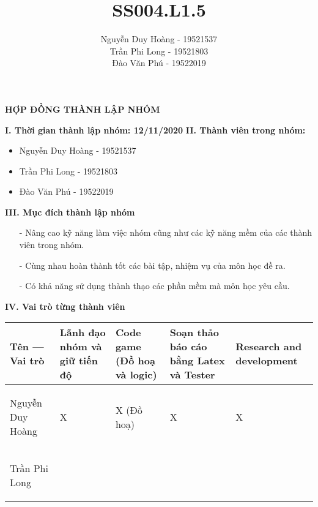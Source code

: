 \documentclass{article}
\title{\textbf{SS004.L1.5}}
\author{Nguyễn Duy Hoàng - 19521537\\Trần Phi Long - 19521803\\Đào Văn Phú - 19522019}
\begin{document}
\begin{center}
    \textbf{\Large{HỢP ĐỒNG THÀNH LẬP NHÓM}}
\end{center}

\begin{flushleft}
\textbf{\large I. Thời gian thành lập nhóm: 12/11/2020}
\newline
\textbf{\large II. Thành viên trong nhóm:}
\begin{center}
    \begin{itemize}
        \item Nguyễn Duy Hoàng - 19521537
        \item Trần Phi Long - 19521803
        \item Đào Văn Phú - 19522019
    \end{itemize}
\end{center}
\textbf{\large III. Mục đích thành lập nhóm}

\begin{itemize}
    \item[-]Nâng cao kỹ năng làm việc nhóm cũng như các kỹ năng mềm của các thành viên trong nhóm.
    \item[-]Cùng nhau hoàn thành tốt các bài tập, nhiệm vụ của môn học đề ra.
    \item[-]Có khả năng sử dụng thành thạo các phần mềm mà môn học yêu cầu.
\end{itemize}
\textbf{\large IV. Vai trò từng thành viên}
\begin{tabular}{|>{\raggedright\arraybackslash}p{3cm}| >{\raggedright\arraybackslash}p{3cm}|
>{\raggedright\arraybackslash}p{3cm}|
>{\raggedright\arraybackslash}p{3cm}|
>{\raggedright\arraybackslash}p{3cm}|}
    \hline
        \begin{center}
            Tên --- Vai trò
        \end{center}

        &Lãnh đạo nhóm và giữ tiến độ

        &Code game (Đồ hoạ và logic)

        &Soạn thảo báo cáo bằng Latex và Tester
        
        &Research and development
        \\
    \hline
        \begin{center}
            Nguyễn Duy Hoàng
        \end{center} & \begin{center}
            X
        \end{center} & \begin{center}
            X (Đồ hoạ)
        \end{center} & \begin{center}
            X
        \end{center} & \begin{center}
            X
        \end{center}
        \\
    \hline
        \begin{center}
            Trần Phi Long
        \end{center} & \begin{center}
            

\end{center}
\end{tabular}
\end{flushleft}
\end{document}
